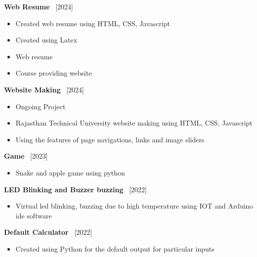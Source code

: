 \documentclass[10pt]{article}
\begin{document}

 \textbf{\large{Web Resume}}  \hfill {\ \small [2024]}
 \\[-20 pt]
	\begin{itemize}[itemsep = -0.75 mm]
	\item \noindent Created web resume using HTML, CSS, Javascript
	\item \noindent Created using Latex
	\item \noindent Web resume
	\item \noindent Course providing website

	\end{itemize} 


  \textbf{\large{Website Making}}  \hfill {\ \small [2024]}
 \\[-20 pt]
	\begin{itemize}[itemsep = -0.75 mm]
	\item \noindent Ongoing Project
	\item \noindent Rajasthan Technical University website making using HTML, CSS, Javascript 
	\item \noindent Using the features of page navigations, links and image sliders

	\end{itemize}
  
\textbf{\large{Game}} \hfill {\ \small [2023]}
 \\[-20 pt]
	\begin{itemize}[itemsep = -0.75 mm]
	\item \noindent Snake and apple game using python

	\end{itemize} 
 
\textbf{\large{LED Blinking and Buzzer buzzing}} \hfill {\ \small [2022]}
 \\[-20 pt]
	\begin{itemize}[itemsep = -0.75 mm]
	\item \noindent Virtual led blinking, buzzing due to high temperature using IOT and Arduino ide software

	\end{itemize} 	
 \textbf{\large{Default Calculator}} \hfill {\ \small [2022]}
 \\[-20 pt]
	\begin{itemize}[itemsep = -0.75 mm]
	\item \noindent Created using Python for the default output for particular inputs

	\end{itemize}
 
\end{document}
